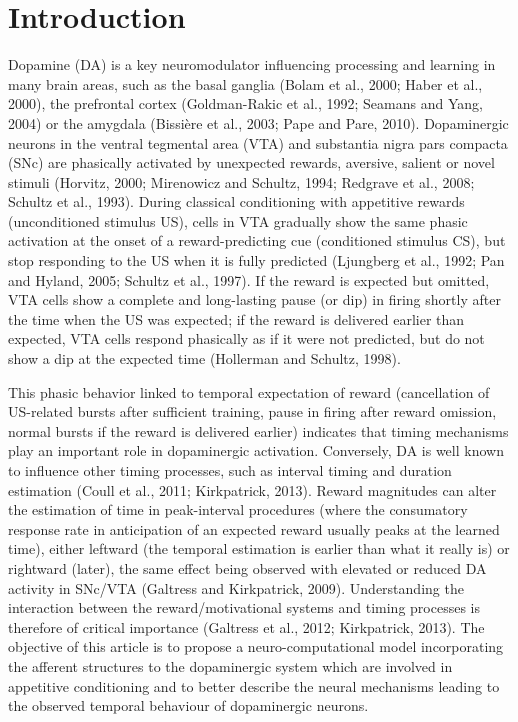 \documentclass[
  11pt,
  a4paper,
]{scrbook}
\begin{document}
\section{Introduction}\label{introduction-3}

Dopamine (DA) is a key neuromodulator influencing processing and
learning in many brain areas, such as the basal ganglia (Bolam et al.,
2000; Haber et al., 2000), the prefrontal cortex (Goldman-Rakic et al.,
1992; Seamans and Yang, 2004) or the amygdala (Bissière et al., 2003;
Pape and Pare, 2010). Dopaminergic neurons in the ventral tegmental area
(VTA) and substantia nigra pars compacta (SNc) are phasically activated
by unexpected rewards, aversive, salient or novel stimuli (Horvitz,
2000; Mirenowicz and Schultz, 1994; Redgrave et al., 2008; Schultz et
al., 1993). During classical conditioning with appetitive rewards
(unconditioned stimulus US), cells in VTA gradually show the same phasic
activation at the onset of a reward-predicting cue (conditioned stimulus
CS), but stop responding to the US when it is fully predicted (Ljungberg
et al., 1992; Pan and Hyland, 2005; Schultz et al., 1997). If the reward
is expected but omitted, VTA cells show a complete and long-lasting
pause (or dip) in firing shortly after the time when the US was
expected; if the reward is delivered earlier than expected, VTA cells
respond phasically as if it were not predicted, but do not show a dip at
the expected time (Hollerman and Schultz, 1998).

This phasic behavior linked to temporal expectation of reward
(cancellation of US-related bursts after sufficient training, pause in
firing after reward omission, normal bursts if the reward is delivered
earlier) indicates that timing mechanisms play an important role in
dopaminergic activation. Conversely, DA is well known to influence other
timing processes, such as interval timing and duration estimation (Coull
et al., 2011; Kirkpatrick, 2013). Reward magnitudes can alter the
estimation of time in peak-interval procedures (where the consumatory
response rate in anticipation of an expected reward usually peaks at the
learned time), either leftward (the temporal estimation is earlier than
what it really is) or rightward (later), the same effect being observed
with elevated or reduced DA activity in SNc/VTA (Galtress and
Kirkpatrick, 2009). Understanding the interaction between the
reward/motivational systems and timing processes is therefore of
critical importance (Galtress et al., 2012; Kirkpatrick, 2013). The
objective of this article is to propose a neuro-computational model
incorporating the afferent structures to the dopaminergic system which
are involved in appetitive conditioning and to better describe the
neural mechanisms leading to the observed temporal behaviour of
dopaminergic neurons.
\end{document}
